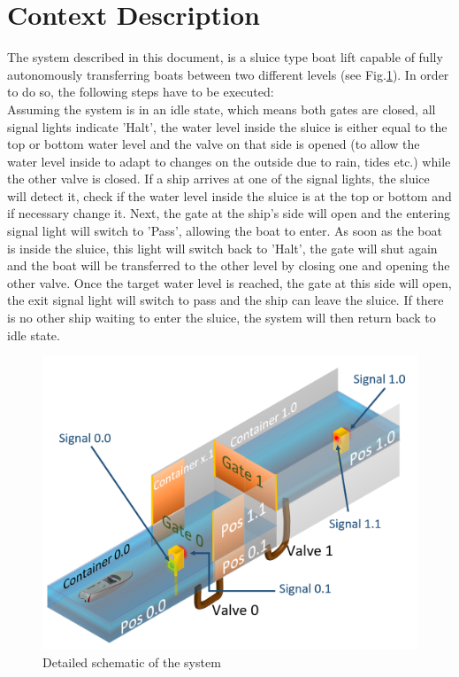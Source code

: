 \section{Context Description}
The system described in this document, is a sluice type boat lift capable of fully autonomously transferring boats between two different levels (see Fig.\ref{fig:boat1}). In order to do so, the following steps have to be executed:\\ 

\noindent Assuming the system is in an idle state, which means both gates are closed, all signal lights indicate 'Halt', the water level inside the sluice is either equal to the top or bottom water level and the valve on that side is opened (to allow the water level inside to adapt to changes on the outside due to rain, tides etc.) while the other valve is closed. If a ship arrives at one of the signal lights, the sluice will detect it, check if the water level inside the sluice is at the top or bottom and if necessary change it. Next, the gate at the ship's side will open and the entering signal light will switch to 'Pass', allowing the boat to enter. As soon as the boat is inside the sluice, this light will switch back to 'Halt', the gate will shut again and the boat will be transferred to the other level by closing one and opening the other valve. Once the target water level is reached, the gate at this side will open, the exit signal light will switch to pass and the ship can leave the sluice. If there is no other ship waiting to enter the sluice, the system will then return back to idle state.

\begin{figure}[!h]
	\includegraphics[width=\linewidth]{PictureName10}
	\caption{Detailed schematic of the system}
	\label{fig:boat1}
\end{figure}